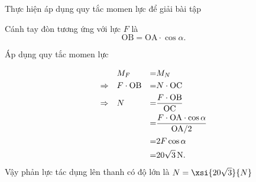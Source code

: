 \begin{dang}{Thực hiện áp dụng quy tắc momen lực để giải bài tập}
{		Cánh tay đòn tương ứng với lực $F$ là
		$$\textrm{OB} = \textrm{OA}\cdot \cos\alpha.$$
		
		
		Áp dụng quy tắc momen lực
		
		\begin{alignat*}{4}
			&M_F&=&M_N\\
			\Rightarrow\quad& F\cdot \textrm{OB} &=& N\cdot \textrm{OC}\\
			\Rightarrow\quad& N  &=& \dfrac{F\cdot \textrm{OB}}{\textrm{OC}}\\
			&&=&
			\dfrac{F\cdot \textrm{OA}\cdot \cos\alpha}{\textrm{OA}/2}\\
			&&=&2 F\cos\alpha \\
			&&=& \SI[parse-numbers=false]{20\sqrt{3}}{N}.
		\end{alignat*}
		Vậy phản lực tác dụng lên thanh có độ lớn là $N=\xsi{20\sqrt{3}}{N}$
		
	}
	
\end{dang}
